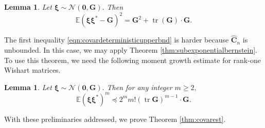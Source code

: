 \documentclass[11pt,letterpaper,twoside,reqno,nosumlimits]{amsart}
\renewcommand{\star}{*}
\newcommand{\mat}[1]{\ensuremath{\bm{#1}}} %
\renewcommand{\vec}[1]{\ensuremath{\bm{#1}}}
\newcommand{\E}{\ensuremath{\mathbb{E}}}
\DeclareMathOperator{\tr}{tr}
\newtheorem{lemma}[thm]{Lemma}
\theoremstyle{remark}
\numberwithin{equation}{section}
\numberwithin{thm}{section}
\numberwithin{prop}{section}
\numberwithin{defn}{section}
\numberwithin{remark}{section}
\begin{document}
\begin{lemma}
\label{lemma:gaussiancentralsecondmoment}
Let $\vec{\xi} \sim \mathcal{N}(\mat{0}, \mat{G}).$ Then
$$
\E(\vec{\xi}\vec{\xi}^\star - \mat{G})^2 = \mat{G}^2 + \tr(\mat{G})\cdot \mat{G}. 
$$
\end{lemma}

The first inequality \eqref{eqn:covardeterministicupperbnd} is harder because $\widehat{\mat{C}}_n$ is unbounded. In this case, we may apply Theorem \ref{thm:subexponentialbernstein}. To use this theorem, we need the following moment growth estimate for rank-one Wishart matrices.

\begin{lemma}
\label{lemma:momentbound}
Let $\vec{\xi} \sim \mathcal{N}(\vec{0},\mat{G}).$ Then for any integer $m \geq 2,$
$$
\E\left(\vec{\xi}\vec{\xi}^\star \right)^m \preceq 2^m m! (\tr \mat{G})^{m-1}\cdot \mat{G}.
$$
\end{lemma}

With these preliminaries addressed, we prove Theorem \ref{thm:covarest}.
\end{document}
